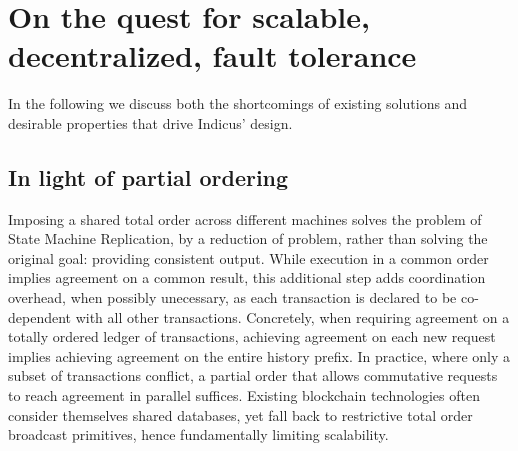\section{On the quest for scalable, decentralized, fault tolerance}
In the following we discuss both the shortcomings of existing solutions and desirable properties that drive Indicus' design. 

\subsection{In light of partial ordering}
Imposing a shared total order across different machines solves the problem of State Machine Replication, by a reduction of problem, rather than solving the original goal: providing consistent output. While execution in a common order implies agreement on a common result, this additional step adds coordination overhead, when possibly unecessary, as each transaction is declared to be co-dependent with all other transactions. 
Concretely, when requiring agreement on a totally ordered ledger of transactions, achieving agreement on each new request implies achieving agreement on the entire history prefix. In practice, where only a subset of transactions conflict, a partial order that allows commutative requests to reach agreement in parallel suffices. Existing blockchain technologies \cite{Hyperledger, EthereumQuorum} often consider themselves shared databases, yet fall back to restrictive total order broadcast primitives, hence fundamentally limiting scalability. 


